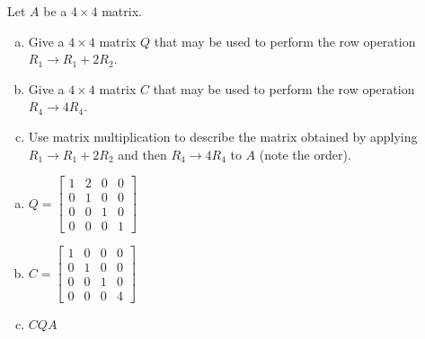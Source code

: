 
\begin{exerciseStatement}


Let \(A\) be a \(4 \times 4\) matrix.


\begin{enumerate}[(a)]
\item Give a \(4 \times 4\) matrix \(Q\) that may be used to perform the row operation \( R_1 \to R_1 + 2R_2 \).
\item Give a \(4 \times 4\) matrix \(C\) that may be used to perform the row operation \( R_4 \to 4R_4 \).
\item Use matrix multiplication to describe the matrix obtained by applying \( R_1 \to R_1 + 2R_2 \) and then \( R_4 \to 4R_4 \) to \(A\) (note the order). 
\end{enumerate}
    
\end{exerciseStatement}
    
\begin{exerciseAnswer} 

\begin{enumerate}[(a)]
\item \(Q= \left[\begin{array}{cccc}
1 & 2 & 0 & 0 \\
0 & 1 & 0 & 0 \\
0 & 0 & 1 & 0 \\
0 & 0 & 0 & 1
\end{array}\right] \)
\item \(C= \left[\begin{array}{cccc}
1 & 0 & 0 & 0 \\
0 & 1 & 0 & 0 \\
0 & 0 & 1 & 0 \\
0 & 0 & 0 & 4
\end{array}\right] \)
\item \(CQA\)
\end{enumerate}
    
\end{exerciseAnswer}
    
